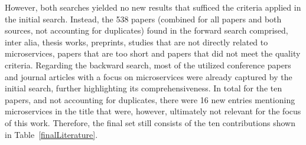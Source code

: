 \documentclass{bmcart}
\begin{document}
However, both searches yielded no new results that sufficed the criteria applied in the initial search. 
Instead, the 538 papers (combined for all papers and both sources, not accounting for duplicates) found in the forward search comprised, inter alia, thesis works, preprints, studies that are not directly related to microservices, papers that are too short and papers that did not meet the quality criteria. Regarding the backward search, most of the utilized conference papers and journal articles with a focus on microservices were already captured by the initial search, further highlighting its comprehensiveness. In total for the ten papers, and not accounting for duplicates, there were 16 new entries mentioning microservices in the title that were, however, ultimately not relevant for the focus of this work. Therefore, the final set still consists of the ten contributions shown in Table~\ref{finalLiterature}.
\end{document}
